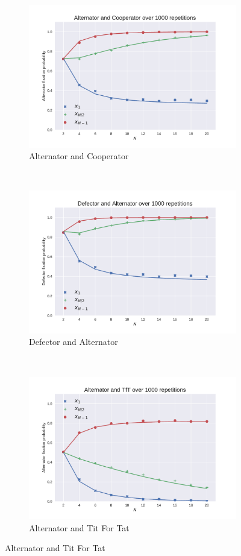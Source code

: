 \documentclass{article}
\begin{document}
\begin{figure}[!hbtp]
    \centering
    \begin{subfigure}[t]{.3\textwidth}
        \centering
        \includegraphics[width=.8\textwidth]{./img/Alternator_v_Cooperator.pdf}
        \caption{Alternator and Cooperator}
    \end{subfigure}%
    ~
    \begin{subfigure}[t]{.3\textwidth}
        \centering
        \includegraphics[width=.8\textwidth]{./img/Defector_v_Alternator.pdf}
        \caption{Defector and Alternator}
    \end{subfigure}%
    ~
    \begin{subfigure}[t]{.3\textwidth}
        \centering
        \includegraphics[width=.8\textwidth]{./img/Alternator_v_TfT.pdf}
        \caption{Alternator and Tit For Tat}
    \end{subfigure}%


\end{figure}
\end{document}
